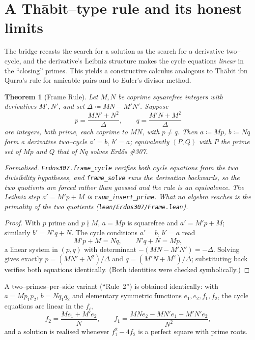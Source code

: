 \documentclass[11pt]{article}
\newtheorem{theorem}{Theorem}[section]
\theoremstyle{definition}
\begin{document}
\section{A Th\=abit--type rule and its honest limits}\label{sec:frame}

The bridge recasts the search for a solution as the search for a derivative two--cycle, and the
derivative's Leibniz structure makes the cycle equations \emph{linear} in the ``closing'' primes.
This yields a constructive calculus analogous to Th\=abit ibn Qurra's rule for amicable pairs and to
Euler's divisor method.

\begin{theorem}[Frame Rule]\label{thm:frame}
Let $M,N$ be coprime squarefree integers with derivatives $M',N'$, and set $\Delta\coloneqq MN-M'N'$.
Suppose
\[
p=\frac{MN'+N^2}{\Delta},\qquad q=\frac{M'N+M^2}{\Delta}
\]
are integers, both prime, each coprime to $MN$, with $p\ne q$. Then $a\coloneqq Mp$, $b\coloneqq Nq$
form a derivative two--cycle $a'=b$, $b'=a$; equivalently $(P,Q)$ with $P$ the prime set of $Mp$ and
$Q$ that of $Nq$ solves Erd\H{o}s \#307.

\textup{Formalised.} \texttt{Erdos307.frame\_cycle} verifies both cycle equations from the two
divisibility hypotheses, and \texttt{frame\_solve} runs the derivation backwards, so the two
quotients are \emph{forced} rather than guessed and the rule is an equivalence. The Leibniz step
$a'=M'p+M$ is \texttt{csum\_insert\_prime}. What no algebra reaches is the primality of the two
quotients \textup{(\texttt{lean/Erdos307/Frame.lean})}.
\end{theorem}

\begin{proof}
With $p$ prime and $p\nmid M$, $a=Mp$ is squarefree and $a'=M'p+M$; similarly $b'=N'q+N$. The cycle
conditions $a'=b$, $b'=a$ read
\[
M'p+M=Nq,\qquad N'q+N=Mp,
\]
a linear system in $(p,q)$ with determinant $-(MN-M'N')=-\Delta$. Solving gives exactly
$p=(MN'+N^2)/\Delta$ and $q=(M'N+M^2)/\Delta$; substituting back verifies both equations
identically. (Both identities were checked symbolically.)
\end{proof}

A two--primes--per--side variant (``Rule~2'') is obtained identically: with $a=Mp_1p_2$, $b=Nq_1q_2$
and elementary symmetric functions $e_1,e_2,f_1,f_2$, the cycle equations are linear in the $f_i$,
\[
f_2=\frac{Me_1+M'e_2}{N},\qquad f_1=\frac{MNe_2-MN'e_1-M'N'e_2}{N^2},
\]
and a solution is realised whenever $f_1^2-4f_2$ is a perfect square with prime roots.
\end{document}

